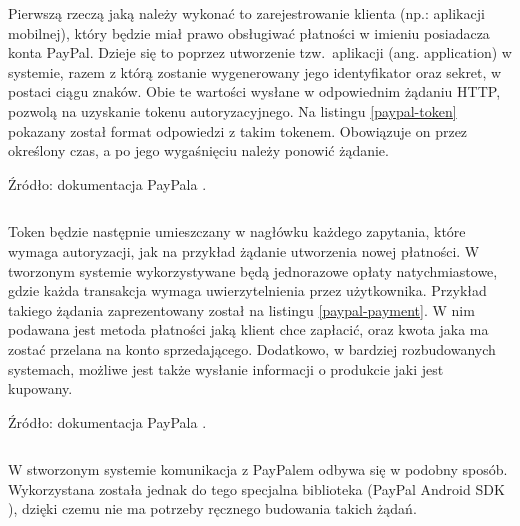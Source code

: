 Pierwszą rzeczą jaką należy wykonać to zarejestrowanie klienta (np.: aplikacji mobilnej), który będzie 
miał prawo obsługiwać płatności w imieniu posiadacza konta PayPal. Dzieje się 
to poprzez utworzenie tzw.~aplikacji (ang. application) w systemie, razem z którą zostanie wygenerowany jego 
identyfikator oraz sekret, w postaci ciągu znaków. Obie te wartości wysłane w 
odpowiednim żądaniu HTTP, pozwolą na uzyskanie tokenu autoryzacyjnego. Na 
listingu \ref{paypal-token} pokazany został format odpowiedzi z takim tokenem. 
Obowiązuje on przez określony czas, a po jego wygaśnięciu należy ponowić 
żądanie.

\begin{singlespace}
	\vspace{-0.4cm}
	\caption*{Źródło: dokumentacja PayPala \cite{elektroniczne_metody_platnosci}.}
	\label{paypal-token}
	\vspace{0.3cm}
	\inputminted[fontsize=\footnotesize]{json}{src/api/paypal-auth.json}
\end{singlespace}

Token będzie następnie umieszczany w nagłówku każdego zapytania, które 
wymaga autoryzacji, jak na przykład żądanie utworzenia nowej płatności. 
W tworzonym systemie wykorzystywane będą jednorazowe opłaty natychmiastowe, 
gdzie każda transakcja wymaga uwierzytelnienia przez użytkownika. Przykład 
takiego żądania zaprezentowany został na listingu \ref{paypal-payment}. W nim 
podawana jest metoda płatności jaką klient chce zapłacić, oraz kwota jaka ma zostać przelana na konto 
sprzedającego. Dodatkowo, w bardziej rozbudowanych systemach, możliwe jest 
także wysłanie informacji o produkcie jaki jest kupowany.

\newpage

\begin{singlespace}
	\vspace{-0.4cm}
	\caption*{Źródło: dokumentacja PayPala \cite{elektroniczne_metody_platnosci}.}
	\label{paypal-payment}
	\vspace{0.3cm}
	\inputminted[fontsize=\footnotesize]{json}{src/api/paypal-payment-request.json}
\end{singlespace}

W stworzonym systemie komunikacja z PayPalem odbywa się w podobny sposób. 
Wykorzystana została jednak do tego specjalna biblioteka (PayPal Android SDK \cite{android_paypal_sdk}), dzięki czemu nie ma 
potrzeby ręcznego budowania takich żądań. 

